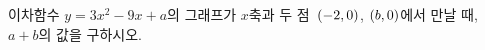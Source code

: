 이차함수 $y=3x^2-9x+a$의 그래프가 $x$축과 두 점~$(-2{,}\mkern3mu\mathopen{}0)$, $(b{,}\mkern3mu\mathopen{}0)$에서 만날 때, $a+b$의 값을 구하시오. 
